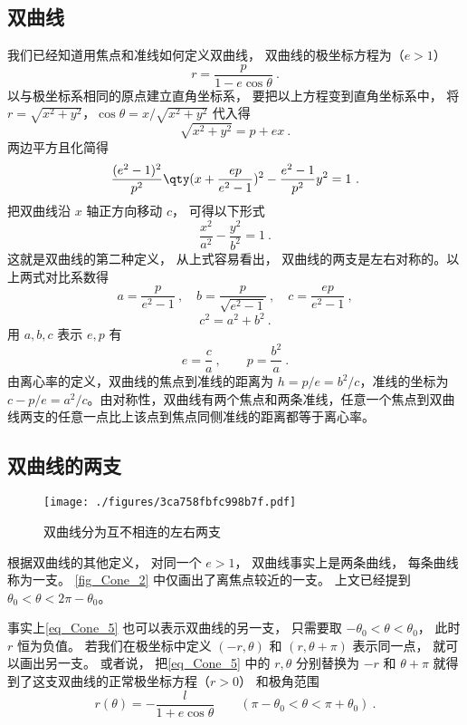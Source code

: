 \subsection{双曲线}
我们已经知道用焦点和准线如何定义双曲线， 双曲线的极坐标方程为（$e>1$）
\begin{equation}
r = \frac{p}{1 - e\cos \theta }~.
\end{equation}
以与极坐标系相同的原点建立直角坐标系， 要把以上方程变到直角坐标系中， 将$r = \sqrt{x^2 + y^2}$，$\cos \theta  = x/\sqrt{x^2 + y^2}$ 代入得
\begin{equation}
\sqrt{x^2 + y^2}  = p + ex~.
\end{equation}
两边平方且化简得
\begin{equation}
\frac{(e^2 - 1)^2}{p^2} \qty(x + \frac{ep}{e^2 - 1} )^2 - \frac{e^2 - 1}{p^2} y^2 = 1~.
\end{equation}
把双曲线沿 $x$ 轴正方向移动 $c$， 可得以下形式
\begin{equation}\label{eq_Cone_8}
\frac{x^2}{a^2} - \frac{y^2}{b^2} = 1~.
\end{equation}
这就是双曲线的第二种定义， 从上式容易看出， 双曲线的两支是左右对称的。以上两式对比系数得
\begin{equation}
a = \frac{p}{e^2 - 1}~, \quad  b = \frac{p}{\sqrt{e^2 - 1} }~, \quad c = \frac{ep}{e^2 - 1}~,
\end{equation}
\begin{equation}
c^2 = a^2 + b^2~.
\end{equation}
用 $a, b, c$ 表示 $e,p$ 有
\begin{equation}
e = \frac{c}{a} ~,\qquad p = \frac{b^2}{a}~.
\end{equation}
由离心率的定义，双曲线的焦点到准线的距离为 $h = p/e=b^2/c$，准线的坐标为 $c-p/e = a^2/c$。由对称性，双曲线有两个焦点和两条准线，任意一个焦点到双曲线两支的任意一点比上该点到焦点同侧准线的距离都等于离心率。
\subsection{双曲线的两支}
\begin{figure}[ht]
\centering
\texttt{[image: ./figures/3ca758fbfc998b7f.pdf]}
\caption{双曲线分为互不相连的左右两支} \label{fig_Cone_3}
\end{figure}
根据双曲线的其他定义， 对同一个 $e>1$， 双曲线事实上是两条曲线， 每条曲线称为一支。 \autoref{fig_Cone_2} 中仅画出了离焦点较近的一支。 上文已经提到 $\theta_0< \theta < 2\pi-\theta_0$。

事实上\autoref{eq_Cone_5} 也可以表示双曲线的另一支， 只需要取 $-\theta_0< \theta < \theta_0$， 此时 $r$ 恒为负值。 若我们在极坐标中定义 $(-r, \theta)$ 和 $(r, \theta + \pi)$ 表示同一点， 就可以画出另一支。 或者说， 把\autoref{eq_Cone_5} 中的  $r,\theta$ 分别替换为 $-r$ 和 $\theta+\pi$ 就得到了这支双曲线的正常极坐标方程（$r > 0$） 和极角范围
\begin{equation}\label{eq_Cone_6}
r(\theta) = -\frac{l}{1 + e\cos\theta} \qquad (\pi - \theta_0<\theta < \pi + \theta_0)~.
\end{equation}

